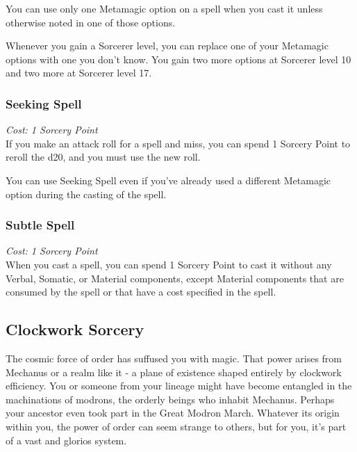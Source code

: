 \documentclass[letterpaper,openany,oneside,twocolumn]{book}
\begin{document}
You can use only one Metamagic option on a spell when you cast it unless otherwise noted in one of those options.

Whenever you gain a Sorcerer level, you can replace one of your Metamagic options with one you don't know. You gain two more options at Sorcerer level 10 and two more at Sorcerer level 17.
\vfill\eject
\subsubsection*{Seeking Spell}
\textit{Cost: 1 Sorcery Point}\\
If you make an attack roll for a spell and miss, you can spend 1 Sorcery Point to reroll the d20, and you must use the new roll.

You can use Seeking Spell even if you've already used a different Metamagic option during the casting of the spell.
\subsubsection*{Subtle Spell}
\textit{Cost: 1 Sorcery Point}\\
When you cast a spell, you can spend 1 Sorcery Point to cast it without any Verbal, Somatic, or Material components, except Material components that are consumed by the spell or that have a cost specified in the spell.

\subsection*{Clockwork Sorcery}
The cosmic force of order has suffused you with magic. That power arises from Mechanus or a realm like it - a plane of existence shaped entirely by clockwork efficiency. You or someone from your lineage might have become entangled in the machinations of modrons, the orderly beings who inhabit Mechanus. Perhaps your ancestor even took part in the Great Modron March. Whatever its origin within you, the power of order can seem strange to others, but for you, it's part of a vast and glorios system.
\end{document}
